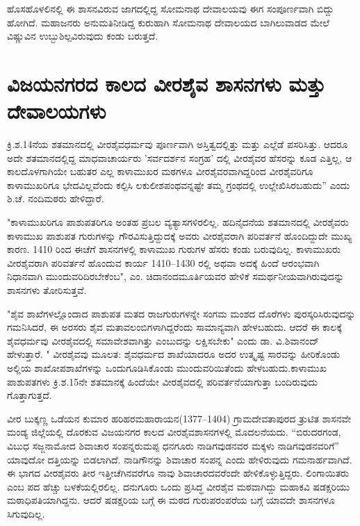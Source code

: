 ಹೊಸಹೊಳಲಿನಲ್ಲಿ ಈ ಶಾಸನವಿರುವ ಜಾಗದಲ್ಲಿದ್ದ ಸೋಮನಾಥ ದೇವಾಲಯವು ಈಗ ಸಂಪೂರ್ಣವಾಗಿ ಬಿದ್ದು ಹೋಗಿದೆ. ಮಹಾಜನರು ಅನುಮತಿನೀಡಿದ್ದ ಕುರುಹಾಗಿ ಸೋಮನಾಥ ದೇವಾಲಯದ ಬಾಗಿಲುವಾಡದ ಮೇಲೆ ವಿಷ್ಣುವಿನ ಉಬ್ಬುಶಿಲ್ಪವಿರುವುದು ಕಂಡು ಬರುತ್ತದೆ.


\section{ವಿಜಯನಗರದ ಕಾಲದ ವೀರಶೈವ ಶಾಸನಗಳು ಮತ್ತು ದೇವಾಲಯಗಳು}

ಕ್ರಿ.ಶ.14ನೆಯ ಶತಮಾನದಲ್ಲಿ ವೀರಶೈವಧರ್ಮವು ಪೂರ್ಣವಾಗಿ ಅಸ್ತಿತ್ವದಲ್ಲಿತ್ತು ಮತ್ತು ಎಲ್ಲೆಡೆ ಪಸರಿಸಿತ್ತು. ಆದರೂ ಅದೇ ಶತಮಾನದಲ್ಲಿದ್ದ ಮಾಧವಾಚಾರ್ಯರು ’ಸರ್ವದರ್ಶನ ಸಂಗ್ರಹ’ ದಲ್ಲಿ ವೀರಶೈವರ ಹೆಸರನ್ನು ಕೂಡ ಎತ್ತಿಲ್ಲ, ಆ ಕಾಲದೊಳಗಾಗಿಯೇ ಬಹುತರ ಎಲ್ಲ ಕಾಳಾಮುಖರ ಮಠಗಳೂ ವೀರಶೈವರವಾಗಿದ್ದರಿಂದ ವೀರಶೈವರಿಗೂ ಕಾಳಾಮುಖರಿಗೂ ಭೇದವಿಲ್ಲವೆಂದು ಕಲ್ಪಿಸಿ ಲಕುಲೀಶಪಂಥವನ್ನಷ್ಟೇ ತಮ್ಮ ಗ್ರಂಥದಲ್ಲಿ ಉಲ್ಲೇಖಿಸಿರಬಹುದು” ಎಂದು ಶಿ.ಚೆ. ನಂದಿಮಠರು ಹೇಳಿದ್ದಾರೆ.

"ಕಾಳಾಮುಖರಿಗೂ ಪಾಶುಪತರಿಗೂ ಅಂತಹ ಪ್ರಬಲ ವ್ಯತ್ಯಾಸಗಳಿರಲಿಲ್ಲ. ಹದಿನೈದನೆಯ ಶತಮಾನದಲ್ಲಿ ವೀರಶೈವರು ಕಾಳಾಮುಖ ಪಾಶುಪತ ಗುರುಗಳನ್ನು ಗೌರವಿಸುತ್ತಿದ್ದುದಕ್ಕೆ ಅವರು ವೀರಶೈವರಾಗಿ ಪರಿವರ್ತನೆ ಹೊಂದಿದ್ದುದೇ ಮುಖ್ಯ ಕಾರಣ. 1410 ರಿಂದ ಈಚೆಗೆ ಶಾಸನಗಳಲ್ಲಿ ಕಾಳಾಮುಖ ಗುರುಗಳ ಹೆಸರು ಕಂಡು ಬರುವುದಿಲ್ಲ. ಕಾಳಾಮುಖರು ವೀರಶೈವರಾಗಿ ಪರಿವರ್ತನೆ ಹೊಂದುವ ಕಾರ್ಯ 1410–1430 ರಲ್ಲಿ ಅಥವಾ ಅದಕ್ಕೆ ಹಿಂದೆ ಆರಂಭವಾಗಿ ನಿಧಾನವಾಗಿ ಮುಂದುವರಿದಿರಬೇಕೆಂಬ", ಎಂ. ಚಿದಾನಂದಮೂರ್ತಿಯವರ ಹೇಳಿಕೆ ಸಮರ್ಥನೀಯವಾಗಿರುವುದನ್ನು ಶಾಸನಗಳು ತೋರಿಸುತ್ತವೆ.

"ಶೈವ ಶಾಖೆಗಳಲ್ಲೊಂದಾದ ಪಾಶುಪತ ಮತದ ರಾಜಗುರುಗಳನ್ನೇ ಸಂಗಮ ಮಂಶದ ದೊರೆಗಳು ಪುರಸ್ಕರಿಸಿರುವುದನ್ನು ಗಮನಿಸಿದರೆ, ಈ ಅರಸರು ಶೈವ ಮತಾವಲಂಬಿಗಳಾಗಿದ್ದರೆಂದು ಸಾಮಾನ್ಯವಾಗಿ ಹೇಳಬಹುದು. ಆದರೆ ಈ ಕಾಲಕ್ಕೆ ಶೈವಧರ್ಮವು ವೀರಶೈವದಲ್ಲಿ ಸಮಾವೇಶವಾಗಿತ್ತು ಎಂಬುದನ್ನು ಲಕ್ಷಿಸಬೇಕು" ಎಂದು ಡಾ. ವಿ.ಶಿವಾನಂದ್​ ಹೇಳುತ್ತಾರೆ. " ವೀರಶೈವವು ಮೂಲತ: ಶೈವಧರ್ಮದ ಶಾಖೆಯಾದರೂ ಅದರ ಉತ್ಕೃಷ್ಟ ಸಾರವನ್ನು ಹೀರಿಕೊಂಡು ಅಲ್ಲಿಯ ಶಾಖೋಪಶಾಖೆಗಳನ್ನು ಒಂದುಗೂಡಿಸಿಕೊಂಡು ಮುಂದುವರಿಯಿತೆಂದು ಹೇಳಬಹುದು.ಕಾಳಾಮುಖ ಪಾಶುಪತಗಳು ಕ್ರಿ.ಶ.15ನೇ ಶತಮಾನಕ್ಕೆ ಹಿಂದೆಯೇ ವೀರಶೈವದಲ್ಲಿ ಪರಿವರ್ತನೆಯಾಗುತ್ತಾ ಬಂದಿರುವುದು ಗೊತ್ತಾಗುತ್ತದೆ.

ವೀರ ಬುಕ್ಕಣ್ಣ ಒಡೆಯನ ಕುಮಾರ ಹರಿಹರಮಹಾರಾಯನ(1377–1404) ಗ್ರಾಮದೇವತಾಪುರದ ತ್ರುಟಿತ ಶಾಸನವೇ ಮಂಡ್ಯ ಜಿಲ್ಲೆಯಲ್ಲಿ ದೊರಕುವ ವಿಜಯನಗರ ಕಾಲದ ವೀರಶೈವಶಾಸನಗಳಲ್ಲಿ ಮೊದಲನೆಯದು. “ಬಿರುದರಗಂಡ, ವಿಬುಧ ಸಜ್ಜನಾಮೋದ ಶಿವಾಚಾರ ಸಂಪನ್ನರುಮಪ್ಪ ಧನಗೂರು ನಾಡಿಗವುಡನವರ ಮಕ್ಕಳು ನಾಡಿಗವುಡನವರಿಗೆ” ಯಾವುದೋ ದತ್ತಿಯನ್ನು ಬಿಡಲಾಗಿದೆ. ನಾಡಿಗೌನನ್ನು ಶಿವಾಚಾರ ಸಂಪನ್ನ ಎಂದು ಹೇಳಿರುವುದು ಗಮನಾರ್ಹವಾಗಿದೆ. ಈ ಭಾಗದ ವೀರಶೈವರು ತೀರ ಇತ್ತೀಚೆಗಿನವರೆಗೂ ನಾವು ಶಿವಾಚಾರದವರೆಂದೇ ಹೇಳಿಕೊಳ್ಳುತ್ತಿದ್ದರು. ಲಿಂಗಾಯಿತರು ಎಂಬ ಪದ ಹೆಚ್ಚು ಬಳಕೆಯಲ್ಲಿರಲಿಲ್ಲ. ದನುಗೂರು ಒಂದು ಪ್ರಸಿದ್ಧ ವೀರಶೈವ ಮಠವಾಗಿದ್ದು ಮಹಾಕವಿ ಷಡಕ್ಷರಿಯು ಮಠಾಧಿಪತಿಯಾಗಿದ್ದನು. ಆದರೆ ಷಡಕ್ಷರಿಯ ಬಗ್ಗೆ ಈ ಮಠದ ಗುರುಪರಂಪರೆಯ ಬಗ್ಗೆ ಯಾವದೇ ಶಾಸನಗಳೂ ಸಿಗುವುದಿಲ್ಲ.

